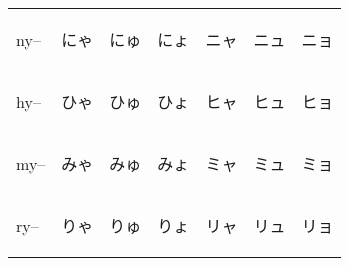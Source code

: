 \begin{table}[H]
\begin{tabular}{l|ccc|ccc}
        ny--   & {\begin{CJK}{UTF8}{min} にゃ \end{CJK}} & {\begin{CJK}{UTF8}{min} にゅ \end{CJK}} & {\begin{CJK}{UTF8}{min} にょ \end{CJK}} & {\begin{CJK}{UTF8}{min} ニャ \end{CJK}} & {\begin{CJK}{UTF8}{min} ニュ \end{CJK}} & {\begin{CJK}{UTF8}{min} ニョ \end{CJK}} \\
        hy--   & {\begin{CJK}{UTF8}{min} ひゃ \end{CJK}} & {\begin{CJK}{UTF8}{min} ひゅ \end{CJK}} & {\begin{CJK}{UTF8}{min} ひょ \end{CJK}} & {\begin{CJK}{UTF8}{min} ヒャ \end{CJK}} & {\begin{CJK}{UTF8}{min} ヒュ \end{CJK}} & {\begin{CJK}{UTF8}{min} ヒョ \end{CJK}} \\
        my--   & {\begin{CJK}{UTF8}{min} みゃ \end{CJK}} & {\begin{CJK}{UTF8}{min} みゅ \end{CJK}} & {\begin{CJK}{UTF8}{min} みょ \end{CJK}} & {\begin{CJK}{UTF8}{min} ミャ \end{CJK}} & {\begin{CJK}{UTF8}{min} ミュ \end{CJK}} & {\begin{CJK}{UTF8}{min} ミョ \end{CJK}} \\
        ry--   & {\begin{CJK}{UTF8}{min} りゃ \end{CJK}} & {\begin{CJK}{UTF8}{min} りゅ \end{CJK}} & {\begin{CJK}{UTF8}{min} りょ \end{CJK}} & {\begin{CJK}{UTF8}{min} リャ \end{CJK}} & {\begin{CJK}{UTF8}{min} リュ \end{CJK}} & {\begin{CJK}{UTF8}{min} リョ \end{CJK}} \\

\end{tabular}
\end{table}
